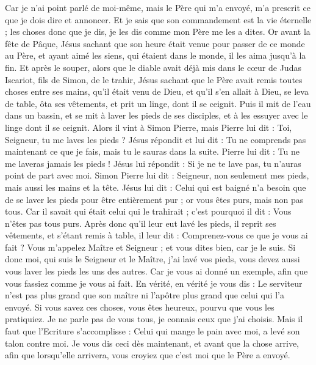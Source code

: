 \begin{multicols}{2}
Car je n'ai point parlé de moi-même, mais le Père qui m'a envoyé, m'a prescrit ce que je dois dire et annoncer.
Et je sais que son commandement est la vie éternelle ; les choses donc que je dis, je les dis comme mon Père me les a dites.
\VerseOne{}Or avant la fête de Pâque, Jésus sachant que son heure était venue pour passer de ce monde au Père, et ayant aimé les siens, qui étaient dans le monde, il les aima jusqu'à la fin.
Et après le souper, alors que le diable avait déjà mis dans le cœur de Judas Iscariot, fils de Simon, de le trahir,
Jésus sachant que le Père avait remis toutes choses entre ses mains, qu'il était venu de Dieu, et qu'il s'en allait à Dieu,
se leva de table, ôta ses vêtements, et prit un linge, dont il se ceignit.
Puis il mit de l'eau dans un bassin, et se mit à laver les pieds de ses disciples, et à les essuyer avec le linge dont il se ceignit.
Alors il vint à Simon Pierre, mais Pierre lui dit : Toi, Seigneur, tu me laves les pieds ?
Jésus répondit et lui dit : Tu ne comprends pas maintenant ce que je fais, mais tu le sauras dans la suite.
Pierre lui dit : Tu ne me laveras jamais les pieds ! Jésus lui répondit : Si je ne te lave pas, tu n'auras point de part avec moi.
Simon Pierre lui dit : Seigneur, non seulement mes pieds, mais aussi les mains et la tête.
Jésus lui dit : Celui qui est baigné n'a besoin que de se laver les pieds pour être entièrement pur ; or vous êtes purs, mais non pas tous.
Car il savait qui était celui qui le trahirait ; c'est pourquoi il dit : Vous n'êtes pas tous purs.
Après donc qu'il leur eut lavé les pieds, il reprit ses vêtements, et s'étant remis à table, il leur dit : Comprenez-vous ce que je vous ai fait ?
Vous m'appelez Maître et Seigneur ; et vous dites bien, car je le suis.
Si donc moi, qui suis le Seigneur et le Maître, j'ai lavé vos pieds, vous devez aussi vous laver les pieds les uns des autres.
Car je vous ai donné un exemple, afin que vous fassiez comme je vous ai fait.
En vérité, en vérité je vous dis : Le serviteur n'est pas plus grand que son maître ni l'apôtre plus grand que celui qui l'a envoyé.
Si vous savez ces choses, vous êtes heureux, pourvu que vous les pratiquiez.
Je ne parle pas de vous tous, je connais ceux que j'ai choisis. Mais il faut que l'Ecriture s'accomplisse : Celui qui mange le pain avec moi, a levé son talon contre moi.
Je vous dis ceci dès maintenant, et avant que la chose arrive, afin que lorsqu'elle arrivera, vous croyiez que c'est moi que le Père a envoyé.

\end{multicols}
